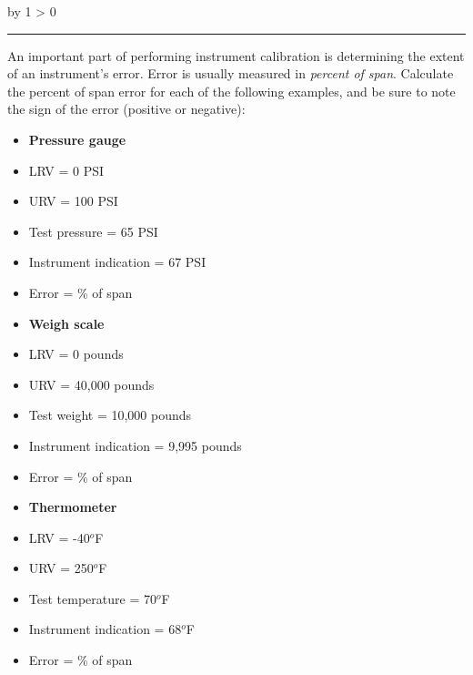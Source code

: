 \documentclass[12pt,a4paper]{article}
\def\oppgave{
            \advance\questnum by 1
            \ifnum \questnum > 0
                 \hrule
                 \vskip 3pt
                 \leftline{Oppgave \the\questnum}
                 \vskip 3pt \fi}
\begin{document}
\vfil \eject 



\oppgave{} 

An important part of performing instrument calibration is determining the extent of an instrument's error.  Error is usually measured in {\it percent of span}.  Calculate the percent of span error for each of the following examples, and be sure to note the sign of the error (positive or negative):

\begin{itemize}
\item{} {\bf Pressure gauge}
\item{} LRV = 0 PSI
\item{} URV = 100 PSI 
\item{} Test pressure = 65 PSI 
\item{} Instrument indication = 67 PSI
\item{} Error = \underbar{\hskip 50pt} \% of span
\end{itemize}

\vskip 10pt

\begin{itemize}
\item{} {\bf Weigh scale}
\item{} LRV = 0 pounds
\item{} URV = 40,000 pounds
\item{} Test weight = 10,000 pounds
\item{} Instrument indication = 9,995 pounds
\item{} Error = \underbar{\hskip 50pt} \% of span
\end{itemize}

\vskip 10pt

\begin{itemize}
\item{} {\bf Thermometer}
\item{} LRV = -40$^{o}$F
\item{} URV = 250$^{o}$F
\item{} Test temperature = 70$^{o}$F
\item{} Instrument indication = 68$^{o}$F
\item{} Error = \underbar{\hskip 50pt} \% of span
\end{itemize}

\vskip 10pt
\end{document}
